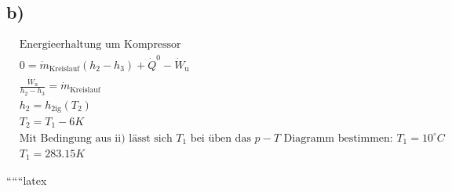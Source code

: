 

\subsection*{b)}

\begin{align*}
    &\text{Energieerhaltung um Kompressor} \\
    &0 = \dot{m}_{\text{Kreislauf}} (h_2 - h_3) + \dot{Q}^0 - \dot{W}_{\text{u}} \\
    &\frac{\dot{W}_{\text{u}}}{h_2 - h_3} = \dot{m}_{\text{Kreislauf}} \\
    &h_2 = h_{\text{2ig}}(T_2) \\
    &T_2 = T_1 - 6K \\
    &\text{Mit Bedingung aus ii) lässt sich } T_1 \text{ bei üben das } p-T \text{ Diagramm bestimmen: } T_1 = 10^\circ C \\
    &T_1 = 283.15 K
\end{align*}

``````latex